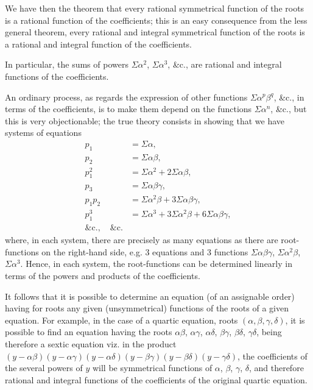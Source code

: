 \documentclass[12pt,a4paper]{article}
\theoremstyle{plain}
\theoremstyle{definition}
\theoremstyle{remark}
\begin{document}
We have then the theorem that every rational symmetrical function of the roots is a rational function of the coefficients; this is an easy consequence from the less general theorem, every rational and integral symmetrical function of the roots is a rational and integral function of the coefficients.

In particular, the sums of powers $\Sigma\alpha^2$, $\Sigma\alpha^3$, \&c., are rational and integral functions of the coefficients.

An ordinary process, as regards the expression of other functions $\Sigma\alpha^p \beta^q$, \&c., in terms of the coefficients, is to make them depend on the functions $\Sigma\alpha^n$, \&c., but this is very objectionable; the true theory consists in showing that we have systems of equations
\begin{align*}
p_1 &= \Sigma\alpha, \\
p_2 &= \Sigma\alpha\beta, \\
p_1^2 &= \Sigma\alpha^2 + 2\Sigma\alpha\beta, \\
p_3 &= \Sigma\alpha\beta\gamma, \\
p_1 p_2 &= \Sigma\alpha^2\beta + 3\Sigma\alpha\beta\gamma, \\
p_1^3 &= \Sigma\alpha^3 + 3\Sigma\alpha^2\beta + 6\Sigma\alpha\beta\gamma, \\
\&\text{c.}, \quad \&\text{c.}
\end{align*}
where, in each system, there are precisely as many equations as there are root-functions on the right-hand side, e.g. 3 equations and 3 functions $\Sigma\alpha\beta\gamma$, $\Sigma\alpha^2\beta$, $\Sigma\alpha^3$. Hence, in each system, the root-functions can be determined linearly in terms of the powers and products of the coefficients.

\clearpage
\setcounter{page}{8}

It follows that it is possible to determine an equation (of an assignable order) having for roots any given (unsymmetrical) functions of the roots of a given equation. For example, in the case of a quartic equation, roots $(\alpha, \beta, \gamma, \delta)$, it is possible to find an equation having the roots $\alpha\beta$, $\alpha\gamma$, $\alpha\delta$, $\beta\gamma$, $\beta\delta$, $\gamma\delta$, being therefore a sextic equation viz. in the product $(y - \alpha\beta)(y - \alpha\gamma)(y - \alpha\delta)(y - \beta\gamma)(y - \beta\delta)(y - \gamma\delta)$, the coefficients of the several powers of $y$ will be symmetrical functions of $\alpha$, $\beta$, $\gamma$, $\delta$, and therefore rational and integral functions of the coefficients of the original quartic equation.
\end{document}
